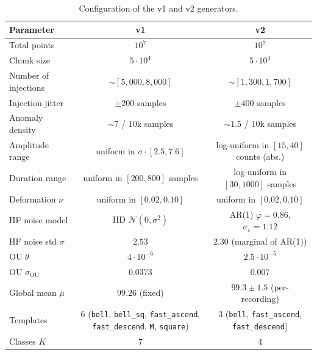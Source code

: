 \begin{table}[H]
    \centering
    \footnotesize
    \begin{tabular}{lcc}
        \toprule
        Parameter & v1 & v2 \\
        \midrule
        Total points          & $10^{7}$ & $10^{7}$ \\
        Chunk size            & $5 \cdot 10^{4}$ & $5 \cdot 10^{4}$ \\
        \midrule
        Number of injections  & $\sim [5{,}000, 8{,}000]$
                              & $\sim [1{,}300, 1{,}700]$ \\
        Injection jitter      & $\pm 200$ samples
                              & $\pm 400$ samples \\
        Anomaly density       & $\sim 7$ / $10$k samples
                              & $\sim 1.5$ / $10$k samples \\
        \midrule
        Amplitude range       & uniform in $\sigma \cdot [2.5, 7.6]$
                              & log-uniform in $[15, 40]$ counts (abs.) \\
        Duration range        & uniform in $[200, 800]$ samples
                              & log-uniform in $[30, 1000]$ samples \\
        Deformation $\nu$     & uniform in $[0.02, 0.10]$
                              & uniform in $[0.02, 0.10]$ \\
        \midrule
        HF noise model        & IID $\mathcal{N}(0, \sigma^2)$
                              & AR(1) $\varphi = 0.86$,
                                $\sigma_\varepsilon = 1.12$ \\
        HF noise std $\sigma$ & $2.53$ & $2.30$ (marginal of AR(1)) \\
        OU $\theta$           & $4 \cdot 10^{-6}$
                              & $2.5 \cdot 10^{-5}$ \\
        OU $\sigma_{\mathrm{OU}}$ & $0.0373$
                              & $0.007$ \\
        Global mean $\mu$     & $99.26$ (fixed)
                              & $99.3 \pm 1.5$ (per-recording) \\
        \midrule
        Templates             & 6 (\texttt{bell}, \texttt{bell\_sq},
                                \texttt{fast\_ascend},
                                \texttt{fast\_descend},
                                \texttt{M}, \texttt{square})
                              & 3 (\texttt{bell}, \texttt{fast\_ascend},
                                \texttt{fast\_descend}) \\
        Classes $K$           & 7 & 4 \\
        \bottomrule
    \end{tabular}
    \caption{Configuration of the v1 and v2 generators.}
    \label{tab:v1-vs-v2-config}
\end{table}

